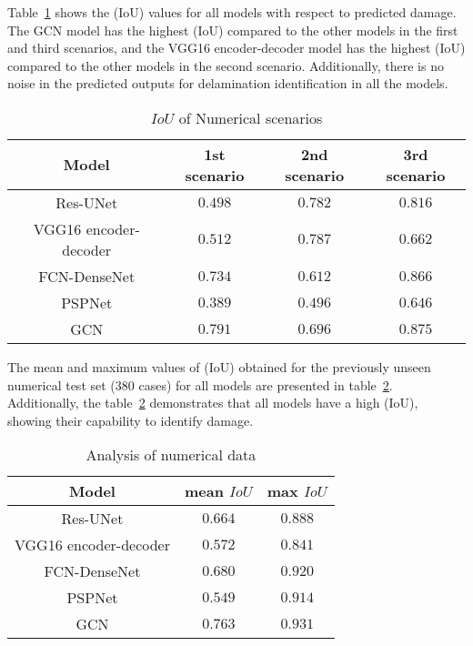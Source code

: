 Table~\ref{tab:table_numerical_scenarios} shows the (IoU) values for all models with respect to predicted damage.
The GCN model has the highest (IoU) compared to the other models in the first and third scenarios, and the VGG16 encoder-decoder model has the highest (IoU) compared to the other models in the second scenario.
Additionally, there is no noise in the predicted outputs for delamination identification in all the models.
\begin{table}[]
	\centering
	\caption{\(IoU\) of Numerical scenarios}
	\label{tab:table_numerical_scenarios}
	\resizebox{\textwidth}{!}
	{
		\begin{tabular}{cccc}\hline
			Model & 1st scenario & 2nd scenario & 3rd scenario \\ \hline
			Res-UNet & \(0.498\) & \(0.782\) & \(0.816\) \\ 
			VGG16 encoder-decoder & \(0.512\) & \(0.787\) & \(0.662\) \\
			FCN-DenseNet & \(0.734\) & \(0.612\) & \(0.866\) \\ 
			PSPNet & \(0.389\) & \(0.496\) & \(0.646\) \\ 
			GCN & \(0.791\) & \(0.696\) & \(0.875\) \\ \hline
		\end{tabular}
	}
\end{table}

The mean and maximum values of (IoU) obtained for the previously unseen numerical test set (380 cases) for all models are presented in table~\ref{tab:table_iou}.
Additionally, the table~\ref{tab:table_iou} demonstrates that all models have a high (IoU), showing their capability to identify damage.
\begin{table}[]
	\centering
	\caption{Analysis of numerical data}
	\label{tab:table_iou}
	\begin{tabular}{ccc}\hline
		Model & mean \(IoU\) & max \(IoU\) \\ \hline
		Res-UNet & \(0.664\) & \(0.888\) \\ 
		VGG16 encoder-decoder & \(0.572\) & \(0.841\) \\ 
		FCN-DenseNet & \(0.680\) & \(0.920\) \\ 
		PSPNet & \(0.549\) & \(0.914\) \\ 
		GCN & \(0.763\) & \(0.931\) \\ \hline
	\end{tabular}
\end{table}

